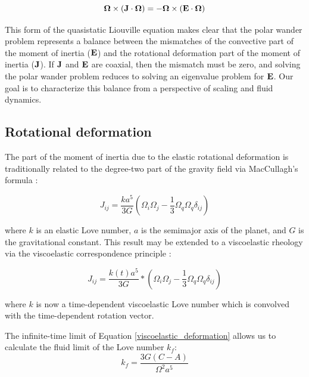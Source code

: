 \documentclass[extra,mreferee]{gji}
\begin{document}
\begin{equation}
{\bf \Omega} \times ({\bf J} \cdot {\bf \Omega}) = -{\bf \Omega } \times ( {\bf E} \cdot {\bf \Omega} )
\label{disequilibrium}
\end{equation}

This form of the quasistatic Liouville equation makes clear that the polar wander problem represents a balance between the mismatches of the convective part of the moment of inertia ($\bf E$) and the rotational deformation part of the moment of inertia ($\bf J$).
If $\bf J$ and $\bf E$ are coaxial, then the mismatch must be zero, and solving the polar wander problem reduces to solving an eigenvalue problem for $\bf E$.
Our goal is to characterize this balance from a perspective of scaling and fluid dynamics.

\subsection{Rotational deformation}

The part of the moment of inertia due to the elastic rotational deformation is traditionally related to the degree-two part of the gravity field via MacCullagh's formula \citep{munk1960rotation}:

\begin{equation}
J_{ij} = \frac{k a^5}{3 G} \left( \Omega_i \Omega_j - \frac{1}{3} \Omega_q \Omega_q \delta_{ij} \right)
\label{elastic_deformation}
\end{equation}

where $k$ is an elastic Love number, $a$ is the semimajor axis of the planet, and $G$ is the gravitational constant.
This result may be extended to a viscoelastic rheology via the viscoelastic correspondence principle \citep[e.g.][]{peltier1974impulse}:

\begin{equation}
J_{ij} = \frac{k(t) a^5}{3 G} * \left( \Omega_i \Omega_j - \frac{1}{3} \Omega_q \Omega_q \delta_{ij} \right)
\label{viscoelastic_deformation}
\end{equation}

where $k$ is now a time-dependent viscoelastic Love number which is convolved with the time-dependent rotation vector.

The infinite-time limit of Equation \ref{viscoelastic_deformation} allows us to calculate the fluid limit of the Love number $k_f$:
\begin{equation}
k_f = \frac{3 G (C-A)}{\Omega^2 a^5}
\label{fluid_love}
\end{equation}
\end{document}
